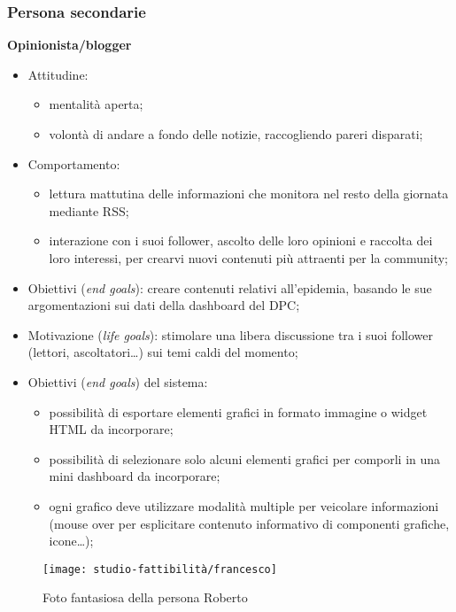 \subsubsection*{Persona secondarie}
\textbf{Opinionista/blogger}
\begin{itemize}
    \item Attitudine:
    \begin{itemize}
        \item mentalità aperta;
        \item volontà di andare a fondo delle notizie, raccogliendo pareri disparati;
    \end{itemize}
    \item Comportamento: 
    \begin{itemize}
        \item lettura mattutina delle informazioni che monitora nel resto della giornata mediante RSS;
        \item interazione con i suoi follower, ascolto delle loro opinioni e raccolta dei loro interessi, per crearvi nuovi contenuti più attraenti per la community;
    \end{itemize}
    \item Obiettivi (\textit{end goals}): creare contenuti relativi all'epidemia, basando le sue argomentazioni sui dati della dashboard del DPC;
    \item Motivazione (\textit{life goals}): stimolare una libera discussione tra i suoi follower (lettori, ascoltatori…) sui temi caldi del momento;
    \item Obiettivi (\textit{end goals}) del sistema:
    \begin{itemize}
        \item possibilità di esportare elementi grafici in formato immagine o widget HTML da incorporare;
        \item possibilità di selezionare solo alcuni elementi grafici per comporli in una mini dashboard da incorporare; 
        \item ogni grafico deve utilizzare modalità multiple per veicolare informazioni (mouse over per esplicitare contenuto informativo di componenti grafiche, icone…); 
    \end{itemize}
\end{itemize}

\begin{wrapfigure}{l}{7cm}
    \texttt{[image: studio-fattibilità/francesco]}
    \caption{Foto fantasiosa della persona Roberto}
\end{wrapfigure}

